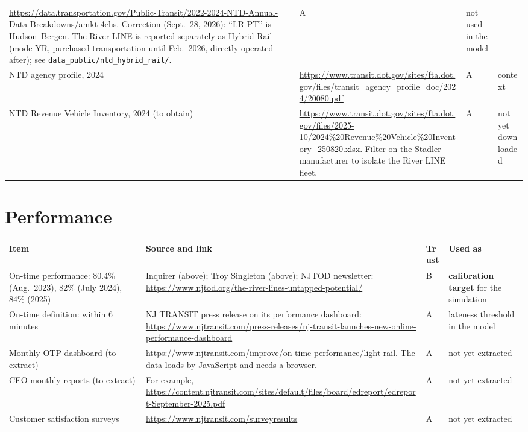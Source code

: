\documentclass[11pt]{article}
\begin{document}
\begin{longtable}{@{}p{3.3cm}p{7.8cm}p{1.0cm}p{2.6cm}@{}}
\url{https://data.transportation.gov/Public-Transit/2022-2024-NTD-Annual-Data-Breakdowns/amkt-4ehs}. Correction (Sept.~28, 2026): ``LR-PT'' is Hudson--Bergen. The River LINE is reported separately as Hybrid Rail (mode YR, purchased transportation until Feb.~2026, directly operated after); see \texttt{data\_public/ntd\_hybrid\_rail/}. &
A & not used in the model \\
NTD agency profile, 2024 &
\url{https://www.transit.dot.gov/sites/fta.dot.gov/files/transit_agency_profile_doc/2024/20080.pdf} &
A & context \\
NTD Revenue Vehicle Inventory, 2024 (to obtain) &
\url{https://www.transit.dot.gov/sites/fta.dot.gov/files/2025-10/2024\%20Revenue\%20Vehicle\%20Inventory_250820.xlsx}. Filter on the Stadler manufacturer to isolate the River LINE fleet. &
A & not yet downloaded \\
\bottomrule
\end{longtable}

\section{Performance}

\begin{longtable}{@{}p{3.3cm}p{7.8cm}p{1.0cm}p{2.6cm}@{}}
\toprule
Item & Source and link & Trust & Used as \\
\midrule
\endhead
On-time performance: 80.4\% (Aug.~2023), 82\% (July 2024), 84\% (2025) &
Inquirer (above); Troy Singleton (above); NJTOD newsletter: \url{https://www.njtod.org/the-river-lines-untapped-potential/} &
B & \textbf{calibration target} for the simulation \\
On-time definition: within 6 minutes &
NJ TRANSIT press release on its performance dashboard: \url{https://www.njtransit.com/press-releases/nj-transit-launches-new-online-performance-dashboard} &
A & lateness threshold in the model \\
Monthly OTP dashboard (to extract) &
\url{https://www.njtransit.com/improve/on-time-performance/light-rail}. The data loads by JavaScript and needs a browser. &
A & not yet extracted \\
CEO monthly reports (to extract) &
For example, \url{https://content.njtransit.com/sites/default/files/board/edreport/edreport-September-2025.pdf} &
A & not yet extracted \\
Customer satisfaction surveys &
\url{https://www.njtransit.com/surveyresults} &
A & not yet extracted \\
\bottomrule
\end{longtable}
\end{document}
